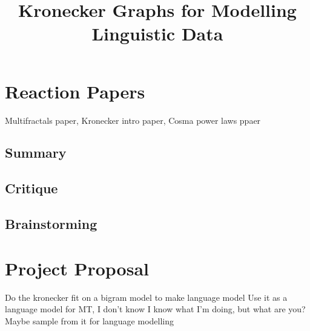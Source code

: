 \documentclass[12pt]{article}
\begin{document}
\title{Kronecker Graphs for Modelling Linguistic Data}


\section{Reaction Papers}

Multifractals paper, Kronecker intro paper, Cosma power laws ppaer

\subsection{Summary}
\subsection{Critique}
\subsection{Brainstorming}

\section{Project Proposal}
Do the kronecker fit on a bigram model to make language model
Use it as a language model for MT, I don't know
I know what I'm doing, but what are you?
Maybe sample from it for language modelling
\end{document}
